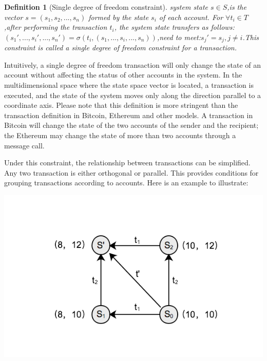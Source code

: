 \documentclass[UTF8,nofonts]{article}
\makeatletter
\newtheorem{definition}{Definition}[section]
\newenvironment{figurehere}
 {\def\@captype{figure}}
 {}
\makeatother
\begin{document}
\begin{multicols}{2}
\begin{definition}[Single degree of freedom constraint]
system state $s \in S$,is the vector $s=(s_{1}, s_{2},...,s_{n})$ formed by the state $s_{i}$ of each account. For $\forall t_{i} \in T$,after performing the transaction $t_{i}$, the system state transfers as follows: $({s_{1}}',..., {s_{i}}',...,{s_{n}}') = \sigma(t_{i}, (s_{1},..., s_{i},...,s_{n}))$,need to meet:${s_{j}}'=s_{j} , j \neq i$.This constraint is called a single degree of freedom constraint for a transaction.
\end{definition}

Intuitively, a single degree of freedom transaction will only change the state of an account without affecting the status of other accounts in the system. In the multidimensional space where the state space vector is located, a transaction is executed, and the state of the system moves only along the direction parallel to a coordinate axis. Please note that this definition is more stringent than the transaction definition in Bitcoin, Ethereum and other models. A transaction in Bitcoin will change the state of the two accounts of the sender and the recipient; the Ethereum may change the state of more than two accounts through a message call.

Under this constraint, the relationship between transactions can be simplified. Any two transaction is either orthogonal or parallel. This provides conditions for grouping transactions according to accounts. Here is an example to illustrate:

\begin{center}
\begin{figurehere}
\includegraphics[width=.8\linewidth]{image/tx-deg-of-free.png}
\caption{Single degree of freedom trading and intermediate state}
\end{figurehere}
\end{center}


\end{multicols}
\end{document}
